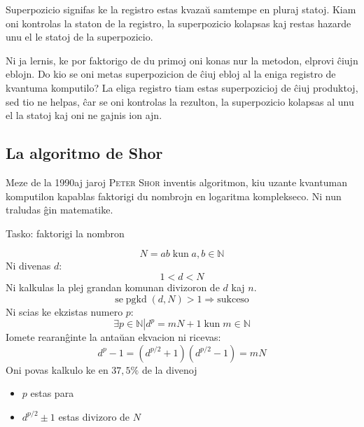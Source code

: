 \documentclass[utf8]{scrartcl}
\DeclareMathOperator{\pgkd}{pgkd}
\begin{document}
Superpozicio signifas ke la registro estas kvazaŭ samtempe en pluraj statoj.
Kiam oni kontrolas la staton de la registro, la superpozicio kolapsas kaj
restas hazarde unu el le statoj de la superpozicio.

Ni ja lernis, ke por faktorigo de du primoj oni konas nur la metodon, elprovi
ĉiujn eblojn.  Do kio se oni metas superpozicion de ĉiuj ebloj al la eniga
registro de kvantuma komputilo?  La eliga registro tiam estas superpozicioj de
ĉiuj produktoj, sed tio ne helpas, ĉar se oni kontrolas la rezulton, la
superpozicio kolapsas al unu el la statoj kaj oni ne gajnis ion ajn.


\subsection{La algoritmo de Shor}

Meze de la 1990aj jaroj \textsc{Peter Shor} inventis algoritmon, kiu uzante
kvantuman komputilon kapablas faktorigi du nombrojn en logaritma
komplekseco. Ni nun traludas ĝin matematike.

\minisec Tasko: faktorigi la nombron

\begin{equation}
  \label{eq:produkto}
  N = a b \;\text{kun}\; a, b \in \mathbb{N}
\end{equation}
%
Ni divenas $d$:
\begin{equation}
  \label{eq:diveno}
  1 < d < N
\end{equation}
%
Ni kalkulas la plej grandan komunan divizoron de $d$ kaj $n$.
\begin{equation}
  \label{eq:diveno-sukceso}
  \text{se} \pgkd(d, N) > 1 \Longrightarrow\text{sukceso}
\end{equation}
%
Ni scias ke ekzistas numero $p$:
\begin{equation}
  \label{eq:ekzistas-p}
  \exists p  \in \mathbb{N} \left|  \right. d^p = m N + 1 \;\text{kun}\; m \in \mathbb{N}
\end{equation}
%
Iomete rearanĝinte la antaŭan ekvacion ni ricevas:
\begin{equation}
  \label{eq:dp-divizoroj}
  d^p - 1 = \left(d^{p/2} + 1\right)\left(d^{p/2} - 1\right) = m N
\end{equation}
%
Oni povas kalkulo ke en $37,5 \%$ de la divenoj
\begin{itemize}
\item $p$ estas para
\item $d^{p/2} \pm 1$ estas divizoro de $N$
\end{itemize}
\end{document}
